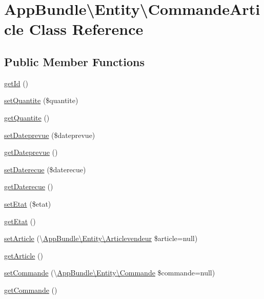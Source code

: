 \hypertarget{class_app_bundle_1_1_entity_1_1_commande_article}{}\section{App\+Bundle\textbackslash{}Entity\textbackslash{}Commande\+Article Class Reference}
\label{class_app_bundle_1_1_entity_1_1_commande_article}
\subsection*{Public Member Functions}
\begin{DoxyCompactItemize}
\item 
\hyperlink{class_app_bundle_1_1_entity_1_1_commande_article_a945bfff56ca3e1726d4dac5edfbcb9b6}{get\+Id} ()
\item 
\hyperlink{class_app_bundle_1_1_entity_1_1_commande_article_af0b85fa0fe8ba6dd5e2b0d1a05163011}{set\+Quantite} (\$quantite)
\item 
\hyperlink{class_app_bundle_1_1_entity_1_1_commande_article_ad3f5c776656a312d668cbd585c284541}{get\+Quantite} ()
\item 
\hyperlink{class_app_bundle_1_1_entity_1_1_commande_article_ab0f0bbfbd8ceeda0b346a7cf8f5eb8ad}{set\+Dateprevue} (\$dateprevue)
\item 
\hyperlink{class_app_bundle_1_1_entity_1_1_commande_article_a174398413d2520b45823031c3106f128}{get\+Dateprevue} ()
\item 
\hyperlink{class_app_bundle_1_1_entity_1_1_commande_article_a8a21189aac46a028a32a847e21a5cdd1}{set\+Daterecue} (\$daterecue)
\item 
\hyperlink{class_app_bundle_1_1_entity_1_1_commande_article_a59ba7948500b1f0f3ca110f1b80cf441}{get\+Daterecue} ()
\item 
\hyperlink{class_app_bundle_1_1_entity_1_1_commande_article_a5cb0349e6c6e8172c910e7e345b7a1fe}{set\+Etat} (\$etat)
\item 
\hyperlink{class_app_bundle_1_1_entity_1_1_commande_article_a3034a5355024516c7f024039cbe9f18e}{get\+Etat} ()
\item 
\hyperlink{class_app_bundle_1_1_entity_1_1_commande_article_a44944f056867cda01cbcfb7ca5b99f2a}{set\+Article} (\textbackslash{}\hyperlink{class_app_bundle_1_1_entity_1_1_articlevendeur}{App\+Bundle\textbackslash{}\+Entity\textbackslash{}\+Articlevendeur} \$article=null)
\item 
\hyperlink{class_app_bundle_1_1_entity_1_1_commande_article_a2dc6f8df663dee7a5beeb9758eddccfc}{get\+Article} ()
\item 
\hyperlink{class_app_bundle_1_1_entity_1_1_commande_article_aa8272fdad840f61d6b473311b00502ef}{set\+Commande} (\textbackslash{}\hyperlink{class_app_bundle_1_1_entity_1_1_commande}{App\+Bundle\textbackslash{}\+Entity\textbackslash{}\+Commande} \$commande=null)
\item 
\hyperlink{class_app_bundle_1_1_entity_1_1_commande_article_a40f0f1c94d901aac6763d2e506e22569}{get\+Commande} ()
\end{DoxyCompactItemize}


